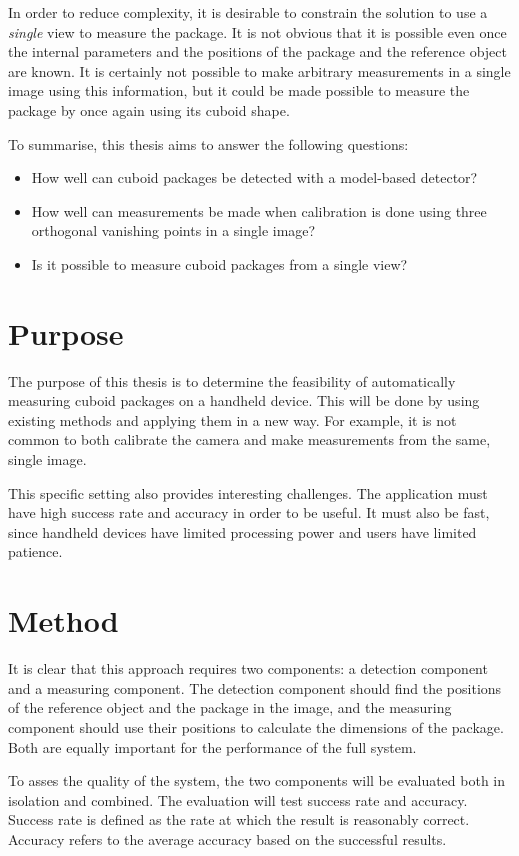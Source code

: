 In order to reduce complexity, it is desirable to constrain the solution to use a \textit{single} view to measure the package.
It is not obvious that it is possible even once the internal parameters and the positions of the package and the reference object are known.
It is certainly not possible to make arbitrary measurements in a single image using this information, but it could be made possible to measure the package by once again using its cuboid shape.

To summarise, this thesis aims to answer the following questions:
\begin{itemize}
	\item How well can cuboid packages be detected with a model-based detector?
	\item How well can measurements be made when calibration is done using three orthogonal vanishing points in a single image?
	\item Is it possible to measure cuboid packages from a single view?
\end{itemize}

\section{Purpose}
The purpose of this thesis is to determine the feasibility of automatically measuring cuboid packages on a handheld device.
This will be done by using existing methods and applying them in a new way.
For example, it is not common to both calibrate the camera and make measurements from the same, single image.

This specific setting also provides interesting challenges.
The application must have high success rate and accuracy in order to be useful.
It must also be fast, since handheld devices have limited processing power and users have limited patience.

\section{Method}
It is clear that this approach requires two components: a detection component and a measuring component.
The detection component should find the positions of the reference object and the package in the image, and the measuring component should use their positions to calculate the dimensions of the package.
Both are equally important for the performance of the full system.

To asses the quality of the system, the two components will be evaluated both in isolation and combined.
The evaluation will test success rate and accuracy.
Success rate is defined as the rate at which the result is reasonably correct.
Accuracy refers to the average accuracy based on the successful results.

